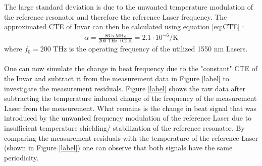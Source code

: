 The large standard deviation is due to the unwanted temperature modulation of the reference resonator and therefore the reference Laser frequency. The approximated CTE of Invar can then be calculated using equation \ref{eq:CTE} :
  \begin{align}
 	\alpha=\frac{86.5 \text{ MHz}}{200 \text{ THz} \cdot 0.2 \text{ K}} = 2.1\cdot 10^{-6} / \text{K}
 \end{align}
where $f_0=200$ THz is the operating frequency of the utilized 1550 nm Lasers. \\\\
One can now simulate the change in beat frequency due to the "constant" CTE of the Invar and subtract it from the measurement data in Figure \ref{label} to investigate the measurement residuals. Figure \ref{label} shows the raw data after subtracting the temperature induced change of the frequency of the measurement Laser from the measurement. What remains is the change in beat signal that was introduced by the unwanted frequency modulation of the reference Laser due to insufficient temperature shielding/ stabilization of the reference resonator. By comparing the measurement residuals with the temperature of the reference Laser (shown in Figure \ref{label}) one can observe that both signals have the same periodicity. 
